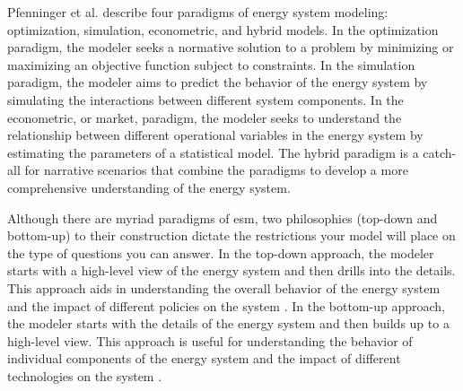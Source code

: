 Pfenninger et al. \cite{pfenninger_energy_2014} describe four
paradigms of energy system modeling: optimization, simulation, econometric, and
hybrid models. In the optimization paradigm, the modeler seeks a normative
solution to a problem by minimizing or maximizing an objective function subject
to constraints. In the simulation paradigm, the modeler aims to predict the
behavior of the energy system by simulating the interactions between different
system components. In the econometric, or market, paradigm, the modeler seeks
to understand the relationship between different operational variables in the
energy system by estimating the parameters of a statistical model. The hybrid
paradigm is a catch-all for narrative scenarios that combine the paradigms to
develop a more comprehensive understanding of the energy system.

Although there are myriad paradigms of \gls{esm}, two philosophies (top-down
and bottom-up) to their construction dictate the restrictions your model will
place on the type of questions you can answer. In the top-down approach, the
modeler starts with a high-level view of the energy system and then drills into
the details. This approach aids in understanding the overall behavior of the
energy system and the impact of different policies on the system
\cite{laha_energy_2017}. In the bottom-up approach, the modeler starts with the
details of the energy system and then builds up to a high-level view. This
approach is useful for understanding the behavior of individual components of
the energy system and the impact of different technologies on the system
\cite{ipcc_ch2_2000,laha_energy_2017}.